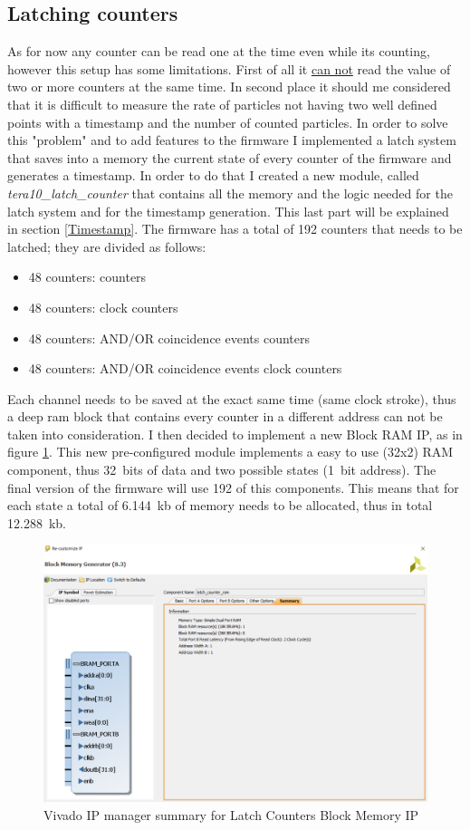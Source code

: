 \subsection{Latching counters}\label{Latch}
\noindent As for now any counter can be read one at the time even while its counting, however this setup has some limitations. First of all it \underline{can not} read the value of two or more counters at the same time.
In second place it should me considered that it is difficult to measure the rate of particles not having two well defined points with a timestamp and the number of counted particles.
In order to solve this "problem" and to add features to the firmware I implemented a latch system that saves into a memory the current state of every counter of the firmware and generates a timestamp.
In order to do that I created a new module, called \textit{tera10\_latch\_counter} that contains all the memory and the logic needed for the latch system and for the timestamp generation. This last part will be explained in section \ref{Timestamp}.
The firmware has a total of 192 counters that needs to be latched; they are divided as follows:
\begin{itemize}
	\item 48 counters: counters
	\item 48 counters: clock counters
	\item 48 counters: AND/OR coincidence events counters
	\item 48 counters: AND/OR coincidence events clock counters
\end{itemize}
\noindent Each channel needs to be saved at the exact same time (same clock stroke), thus a deep ram block that contains every counter in a different address can not be taken into consideration.
I then decided to implement a new Block RAM IP, as in figure \ref{fig:ramip}. This new pre-configured module implements a easy to use (32x2) RAM component, thus 32~bits of data and two possible states (1~bit address). The final version of the firmware will use 192 of this components.
This means that for each state a total of 6.144~kb of memory needs to be allocated, thus in total 12.288~kb. 
\begin{figure}[H]
	\centering
	\includegraphics[width=0.6\linewidth]{IMG/ch4/LATCH_RAM_IP}
	\caption{Vivado IP manager summary for Latch Counters Block Memory IP}
	\label{fig:ramip}
\end{figure}
